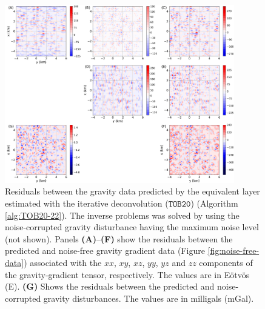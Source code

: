 \begin{figure}[htbp]
	\begin{center}
		\includegraphics[width=10cm]{Fig/TOB20_residuals}
	\end{center}
	\caption{
		Residuals between the gravity data predicted by the equivalent layer estimated with the 
		iterative deconvolution ($\mathtt{TOB20}$) (Algorithm \ref{alg:TOB20-22}).
		The inverse problems was solved by using the noise-corrupted gravity 
		disturbance having the maximum noise level (not shown).
		Panels \textbf{(A)}--\textbf{(F)} show the residuals between the predicted and noise-free
		gravity gradient data (Figure \ref{fig:noise-free-data}) associated with the
		$xx$, $xy$, $xz$, $yy$, $yz$ and $zz$ components of the gravity-gradient tensor, respectively. 
		The values are in Eötvös (E).
		\textbf{(G)} Shows the residuals between the predicted and noise-corrupted gravity disturbances.
		The values are in milligals (mGal).
		}
	\label{fig:residuals-TOB20}
\end{figure}

